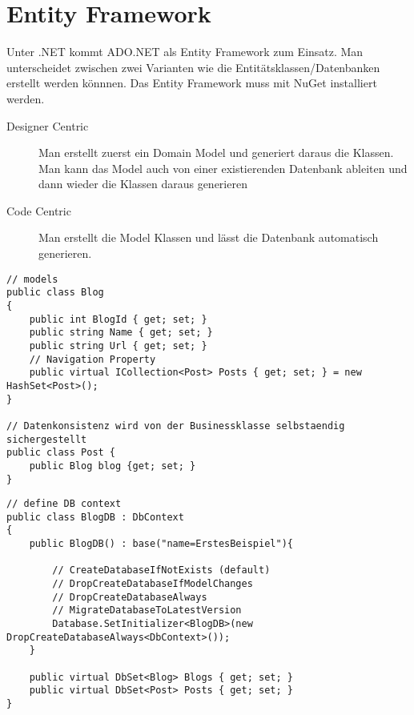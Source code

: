 \section{Entity Framework}
Unter .NET kommt ADO.NET als Entity Framework zum Einsatz. Man unterscheidet zwischen zwei Varianten wie die Entitätsklassen/Datenbanken erstellt werden könnnen. Das Entity Framework muss mit NuGet installiert werden.
\begin{description}
	\item[Designer Centric] Man erstellt zuerst ein Domain Model und generiert daraus die Klassen. Man kann das Model auch von einer existierenden Datenbank ableiten und dann wieder die Klassen daraus generieren
	\item[Code Centric] Man erstellt die Model Klassen und lässt die Datenbank automatisch generieren.
\end{description}

\begin{lstlisting}	
// models
public class Blog
{
	public int BlogId { get; set; }
	public string Name { get; set; }
	public string Url { get; set; }
	// Navigation Property
	public virtual ICollection<Post> Posts { get; set; } = new HashSet<Post>();
}

// Datenkonsistenz wird von der Businessklasse selbstaendig sichergestellt
public class Post {
	public Blog blog {get; set; }
}

\end{lstlisting}

\begin{lstlisting}	
// define DB context
public class BlogDB : DbContext
{
	public BlogDB() : base("name=ErstesBeispiel"){
	
		// CreateDatabaseIfNotExists (default)
		// DropCreateDatabaseIfModelChanges
		// DropCreateDatabaseAlways
		// MigrateDatabaseToLatestVersion
		Database.SetInitializer<BlogDB>(new DropCreateDatabaseAlways<DbContext>());
	}
	
	public virtual DbSet<Blog> Blogs { get; set; }
	public virtual DbSet<Post> Posts { get; set; }
}

\end{lstlisting}

